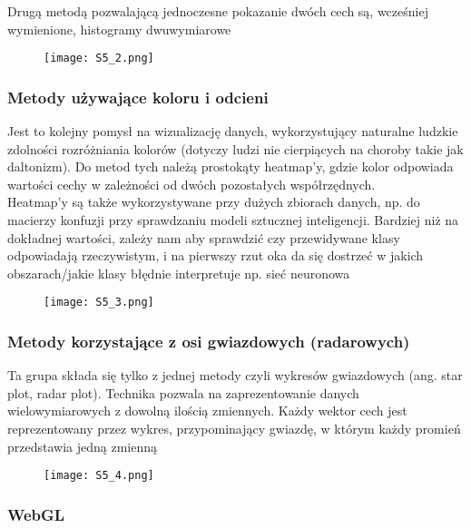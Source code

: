 Drugą metodą pozwalającą jednoczesne pokazanie dwóch cech są, wcześniej wymienione, histogramy dwuwymiarowe

\begin{figure}[H]
	\centering
	\texttt{[image: S5\_2.png]}
\end{figure}

\subsubsection{Metody używające koloru i odcieni}

Jest to kolejny pomysł na wizualizację danych, wykorzystujący naturalne ludzkie zdolności rozróżniania kolorów (dotyczy ludzi nie cierpiących na choroby takie jak daltonizm). Do metod tych należą prostokąty heatmap’y, gdzie kolor odpowiada wartości cechy w zależności od dwóch pozostałych współrzędnych. \\

Heatmap’y są także wykorzystywane przy dużych zbiorach danych, np. do macierzy konfuzji przy sprawdzaniu modeli sztucznej inteligencji. Bardziej niż na dokładnej wartości, zależy nam aby sprawdzić czy przewidywane klasy odpowiadają rzeczywistym, i na pierwszy rzut oka da się dostrzeć w jakich obszarach/jakie klasy błędnie interpretuje np. sieć neuronowa

\begin{figure}[H]
	\centering
	\texttt{[image: S5\_3.png]}
\end{figure}

\subsubsection{Metody korzystające z osi gwiazdowych (radarowych)}

Ta grupa składa się tylko z jednej metody czyli wykresów gwiazdowych (ang. star plot, radar plot). Technika pozwala na zaprezentowanie danych wielowymiarowych z dowolną ilością zmiennych. Każdy wektor cech jest reprezentowany przez wykres, przypominający gwiazdę, w którym każdy promień przedstawia jedną zmienną

\begin{figure}[H]
	\centering
	\texttt{[image: S5\_4.png]}
\end{figure}

\subsubsection{WebGL}


